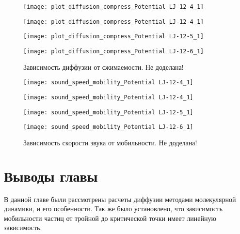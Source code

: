 \begin{figure}[h]
\begin{center}
\begin{minipage}[h]{0.45\linewidth}
\texttt{[image: plot\_diffusion\_compress\_Potential LJ-12-4\_1]}
\end{minipage}
\begin{minipage}[h]{0.45\linewidth}
\texttt{[image: plot\_diffusion\_compress\_Potential LJ-12-4\_1]}
\end{minipage}

\begin{minipage}[h]{0.45\linewidth}
\texttt{[image: plot\_diffusion\_compress\_Potential LJ-12-5\_1]}
\end{minipage}
\begin{minipage}[h]{0.45\linewidth}
\texttt{[image: plot\_diffusion\_compress\_Potential LJ-12-6\_1]}
\end{minipage}
\caption{Зависимость диффузии от сжимаемости. Не доделана!}
\label{risDBeta}
\end{center}
\end{figure}



\begin{figure}[h]
\begin{center}
\begin{minipage}[h]{0.45\linewidth}
\texttt{[image: sound\_speed\_mobility\_Potential LJ-12-4\_1]}
\end{minipage}
\begin{minipage}[h]{0.45\linewidth}
\texttt{[image: sound\_speed\_mobility\_Potential LJ-12-4\_1]}
\end{minipage}

\begin{minipage}[h]{0.45\linewidth}
\texttt{[image: sound\_speed\_mobility\_Potential LJ-12-5\_1]}
\end{minipage}
\begin{minipage}[h]{0.45\linewidth}
\texttt{[image: sound\_speed\_mobility\_Potential LJ-12-6\_1]}
\end{minipage}
\caption{Зависимость скорости звука от мобильности. Не доделана!}
\label{risCMu}
\end{center}
\end{figure}


\section{Выводы главы}\label{C3_3}

В данной главе были рассмотрены расчеты диффузии методами молекулярной динамики, и его особенности. Так же было установлено, что зависимость мобильности частиц от тройной до критической точки имеет линейную зависимость.
